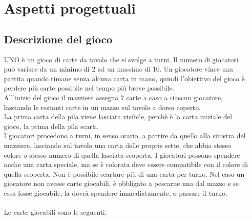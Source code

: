 \documentclass[10pt,a4paper]{article}
\begin{document}
\section{Aspetti progettuali}
\subsection{Descrizione del gioco}
UNO è un gioco di carte da tavolo che si svolge a turni. Il numero di giocatori può variare da un minimo di 2 ad un massimo di 10. Un giocatore vince una partita quando rimane senza alcuna carta in mano, quindi l'obiettivo del gioco è perdere più carte possibile nel tempo più breve possibile.\\All'inizio del gioco il mazziere assegna 7 carte a caso a ciascun giocatore, lasciando le restanti carte in un mazzo sul tavolo a dorso coperto.\\ La prima carta della pila viene lasciata visibile, perchè è la carta iniziale del gioco, la prima della pila scarti.\\ I giocatori procedono a turni, in senso orario, a partire da quello alla sinistra del mazziere, lasciando sul tavolo una carta delle proprie sette, che abbia stesso colore o stesso numero di quella lasciata scoperta. I giocatori possono spendere anche una carta speciale, ma se è colorata deve essere compatibile con il colore di quella scoperta. Non è possibile scartare più di una carta per turno. Nel caso un giocatore non avesse carte giocabili, è obbligato a pescarne una dal mazzo e se essa fosse giocabile, la dovrà spendere immediatamente, o passare il turno.\\\\ Le carte giocabili sono le seguenti:\\
\end{document}
